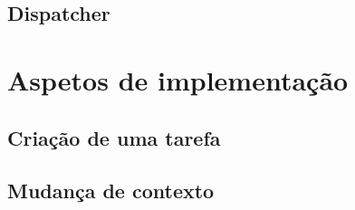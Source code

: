 \documentclass[journal]{IEEEtran}
\begin{document}
\subsection{Dispatcher}

\section{Aspetos de implementação}
\subsection{Criação de uma tarefa}
\subsection{Mudança de contexto}

%
%
\end{document}
